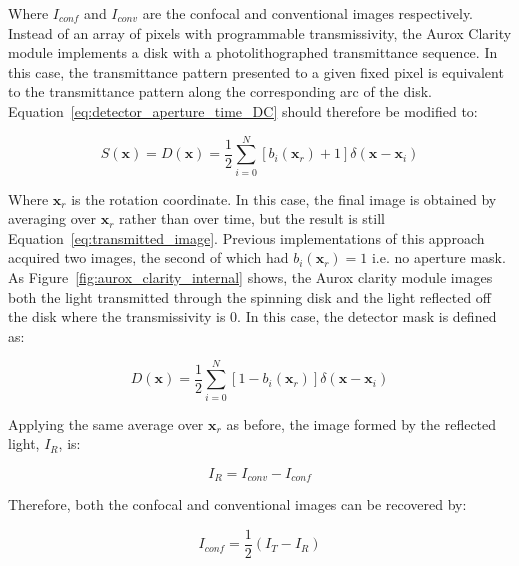 Where $I_{conf}$ and $I_{conv}$ are the confocal and 
conventional images respectively. Instead of an array of 
pixels with programmable transmissivity, the Aurox Clarity 
module implements a disk with a photolithographed 
transmittance sequence. In this case, the transmittance 
pattern presented to a given fixed pixel is equivalent to 
the transmittance pattern along the corresponding arc of 
the disk.\cite{wilson1996confocal} 
Equation~\ref{eq:detector_aperture_time_DC} should therefore 
be modified to:

\begin{equation}\label{eq:detector_aperture_arc}
S\left(\textbf{x}\right) = D\left(\textbf{x}\right) = \frac{1}{2} \sum_{i=0}^{N} \left[b_{i}\left(\textbf{x}_{r}\right) + 1\right]\delta\left(\textbf{x} - \textbf{x}_{i}\right)
\end{equation}

Where $\textbf{x}_{r}$ is the rotation coordinate. In 
this case, the final image is obtained by averaging over 
$\textbf{x}_{r}$ rather than over time, but the result is 
still Equation~\ref{eq:transmitted_image}. Previous 
implementations of this approach acquired two images, the 
second of which had $b_{i}\left(\textbf{x}_{r}\right) = 1$ 
i.e. no aperture mask. As Figure~\ref{fig:aurox_clarity_internal} 
shows, the Aurox clarity module images both the light 
transmitted through the spinning disk and the light 
reflected off the disk where the transmissivity is $0$. In 
this case, the detector mask is defined as:

\begin{equation}\label{eq:detector_aperture_arc_reflect}
D\left(\textbf{x}\right) = \frac{1}{2} \sum_{i=0}^{N} \left[1 - b_{i}\left(\textbf{x}_{r}\right)\right]\delta\left(\textbf{x} - \textbf{x}_{i}\right)
\end{equation}

Applying the same average over $\textbf{x}_{r}$ as before, 
the image formed by the reflected light, $I_{R}$, is:

\begin{equation}\label{eq:reflected_image}
I_{R} = I_{conv} - I_{conf}
\end{equation}

Therefore, both the confocal and conventional images can 
be recovered by:

\begin{equation}\label{eq:confocal_image}
I_{conf} = \frac{1}{2}\left(I_{T} - I_{R}\right)
\end{equation}

